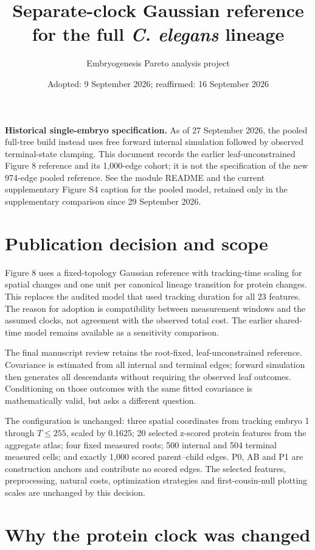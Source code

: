 \documentclass[10pt,letterpaper]{article}
\title{\textbf{Separate-clock Gaussian reference for the full
  \textit{C. elegans} lineage}}
\author{Embryogenesis Pareto analysis project}
\date{Adopted: 9 September 2026; reaffirmed: 16 September 2026}
\begin{document}
\maketitle

\textbf{Historical single-embryo specification.} As of 27 September 2026,
the pooled full-tree build instead uses free forward internal simulation followed
by observed terminal-state clamping. This document records the earlier
leaf-unconstrained Figure 8 reference and its 1,000-edge cohort; it is not the
specification of the new 974-edge pooled reference. See the module README and
the current supplementary Figure S4 caption for the pooled model, retained
only in the supplementary comparison since 29 September 2026.

\section{Publication decision and scope}

Figure 8 uses a fixed-topology Gaussian reference with tracking-time scaling
for spatial changes and one unit per canonical lineage transition for protein
changes. This replaces the audited model that used tracking duration for all
23 features. The reason for adoption is compatibility between measurement
windows and the assumed clocks, not agreement with the observed total cost.
The earlier shared-time model remains available as a sensitivity comparison.

The final manuscript review retains the root-fixed, leaf-unconstrained
reference. Covariance is estimated from all internal and terminal edges;
forward simulation then generates all descendants without requiring the
observed leaf outcomes. Conditioning on those outcomes with the same fitted
covariance is mathematically valid, but asks a different question.

The configuration is unchanged: three spatial coordinates from tracking
embryo 1 through $T\leq255$, scaled by 0.1625; 20 selected z-scored protein
features from the aggregate atlas; four fixed measured roots; 500 internal and
504 terminal measured cells; and exactly 1,000 scored parent--child edges.
P0, AB and P1 are construction anchors and contribute no scored edges.
The selected features, preprocessing, natural costs, optimization strategies
and first-cousin-null plotting scales are unchanged by this decision.

\section{Why the protein clock was changed}
\end{document}
